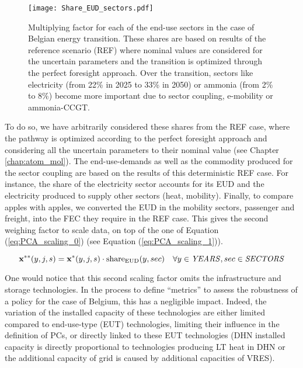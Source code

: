 \begin{figure}[!htbp]
\centering
\texttt{[image: Share\_EUD\_sectors.pdf]}
\caption{Multiplying factor for each of the end-use sectors in the case of Belgian energy transition. These shares are based on results of the reference scenario (REF) where nominal values are considered for the uncertain parameters and the transition is optimized through the perfect foresight approach. Over the transition, sectors like electricity (\ie from 22\% in 2025 to 33\% in 2050) or ammonia (\ie from 2\% to 8\%) become more important due to sector coupling, \eg e-mobility or ammonia-\gls{CCGT}.}
\label{fig:Share_EUD_sectors}
\end{figure}

To do so, we have arbitrarily considered these shares from the REF case, where the pathway is optimized according to the perfect foresight approach and considering all the uncertain parameters to their nominal value (see Chapter \ref{chap:atom_mol}).  The end-use-demands as well as the commodity produced for the sector coupling are based on the results of this deterministic REF case.  For instance, the share of the electricity sector accounts for its \gls{EUD} and the electricity produced to supply other sectors (\eg heat, mobility). Finally, to compare apples with apples, we converted the \gls{EUD} in the mobility sectors, \ie passenger and freight, into the \gls{FEC} they require in the REF case. This gives the second weighing factor to scale data, on top of the one of Equation (\ref{eq:PCA_scaling_0}) (see Equation (\ref{eq:PCA_scaling_1})).

\begin{equation}
 \label{eq:PCA_scaling_1}
\textbf{x}^{**}(y,j,s)=\textbf{x}^{*}(y,j,s)\cdot \text{share}_{\text{EUD}}(y,sec)
 \quad \forall y \in \text{\emph{YEARS}}, sec \in \text{\emph{SECTORS}}
\end{equation}

One would notice that this second scaling factor omits the infrastructure and storage technologies. In the process to define ``metrics'' to assess the robustness of a policy for the case of Belgium, this has a negligible impact. Indeed, the variation of the installed capacity of these technologies are either limited compared to end-use-type (EUT) technologies, \ie limiting their influence in the definition of PCs, or directly linked to these EUT technologies (\eg \gls{DHN} installed capacity is directly proportional to technologies producing \gls{LT} heat in \gls{DHN} or the additional capacity of grid is caused by additional capacities of \gls{VRES}). \\

